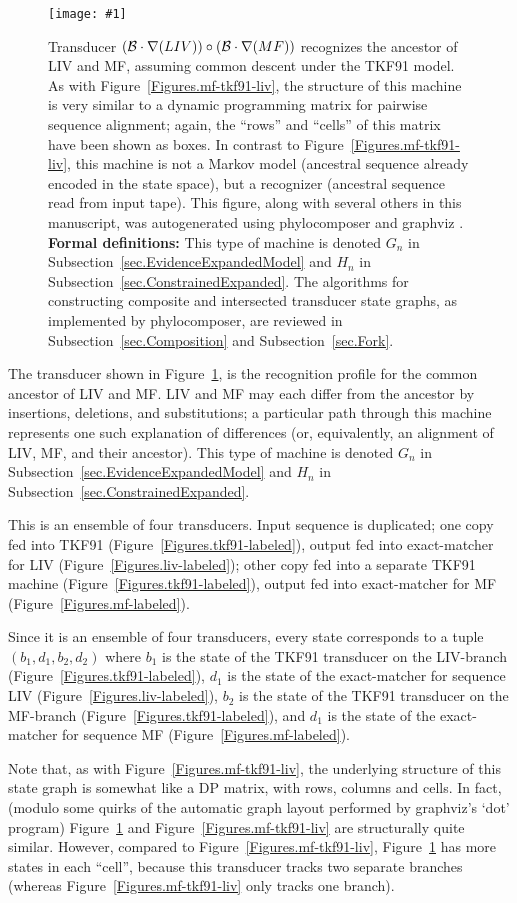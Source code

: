 \documentclass{article}
\newcommand{\secref}[1]{Subsection~\ref{sec.#1}}
\newcommand{\figref}[1]{Figure~\ref{Figures.#1}}
\newcommand{\figlabel}[1]{\label{Figures.#1}}
\newcommand{\easyfig}[4]{
\begin{figure}
\texttt{[image: \#1]}
\caption{ \figlabel{#3} #4}
\end{figure}}
\newcommand{\widepdffig}[2]{\easyfig{#1-fig.pdf}{width=\textwidth}{#1}{#2}}
\newcommand\tkf{{\cal B}}
\newcommand\formaldefs{{\bf Formal definitions: }}
\newcommand\fork{\circ}
\newcommand\recognize{\nabla}
\begin{document}
\widepdffig{fork-tkf91liv-tkf91mf}{Transducer $(\tkf \cdot \recognize(LIV))\fork(\tkf \cdot \recognize(MF))$ recognizes the ancestor of LIV and MF, assuming common descent under the TKF91 model.  
As with \figref{mf-tkf91-liv}, the structure of this machine is very similar to a dynamic programming matrix for pairwise sequence alignment; again, the ``rows'' and ``cells'' of this matrix have been shown as boxes.
In contrast to \figref{mf-tkf91-liv}, this machine is not a Markov model (ancestral sequence already encoded in the state space), but a recognizer (ancestral sequence read from input tape).
This figure, along with several others in this manuscript, was autogenerated using phylocomposer \cite{BradleyHolmes2007} and graphviz \cite{GraphViz}.
\formaldefs
This type of machine is denoted $G_n$ in \secref{EvidenceExpandedModel}
and $H_n$ in \secref{ConstrainedExpanded}.
The algorithms for constructing composite and intersected transducer state graphs, as implemented by phylocomposer, are reviewed in \secref{Composition} and \secref{Fork}.
} 

The transducer shown in \figref{fork-tkf91liv-tkf91mf}, is the recognition profile for the common ancestor of LIV and MF.
LIV and MF may each differ from the ancestor by insertions, deletions, and substitutions;
 a particular path through this machine represents one such explanation of differences
 (or, equivalently, an alignment of LIV, MF, and their ancestor).  
This type of machine is denoted $G_n$ in \secref{EvidenceExpandedModel}
and $H_n$ in \secref{ConstrainedExpanded}.

This is an ensemble of four transducers.
Input sequence is duplicated;
one copy fed into TKF91 (\figref{tkf91-labeled}),
output fed into exact-matcher for LIV (\figref{liv-labeled});
other copy fed into a separate TKF91 machine (\figref{tkf91-labeled}),
output fed into exact-matcher for MF (\figref{mf-labeled}).

Since it is an ensemble of four transducers, every state corresponds to a tuple $(b_1,d_1,b_2,d_2)$
where
$b_1$ is the state of the TKF91 transducer on the LIV-branch (\figref{tkf91-labeled}),
$d_1$ is the state of the exact-matcher for sequence LIV (\figref{liv-labeled}),
$b_2$ is the state of the TKF91 transducer on the MF-branch (\figref{tkf91-labeled}),
and $d_1$ is the state of the exact-matcher for sequence MF (\figref{mf-labeled}).

Note that, as with \figref{mf-tkf91-liv},
the underlying structure of this state graph is somewhat like a DP matrix,
with rows, columns and cells.
In fact, 
(modulo some quirks of the automatic graph layout performed by graphviz's `dot' program)
\figref{fork-tkf91liv-tkf91mf} and \figref{mf-tkf91-liv} are structurally quite similar.
However, compared to \figref{mf-tkf91-liv},
\figref{fork-tkf91liv-tkf91mf} has more states in each ``cell'',
because this transducer tracks two separate branches
(whereas \figref{mf-tkf91-liv} only tracks one branch).
\end{document}
